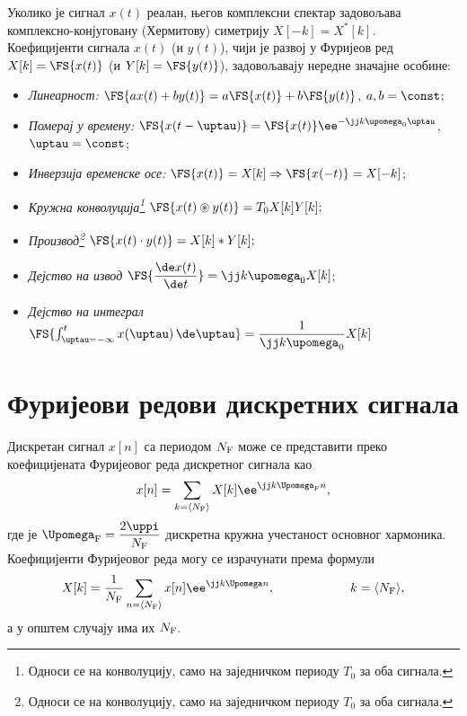 Уколико је сигнал $x(t)$ реалан, његов комплексни спектар задовољава комплексно-конјуговану (Хермитову) симетрију 
$X[-k] = X^{\ast}[k]$. \\[1mm]

Коефицијенти сигнала $x(t)$ (и $y(t)$), чији је развој у Фуријеов ред
$X[k] = \FS{x(t)}$ (и $Y[k] = \FS{y(t)}$),
задовољавају нередне значајне особине: 
\begin{itemize}\itemsep0pt
    \item \emph{Линеарност:}  $\FS{ax(t) + by(t)} = a \FS{x(t)} + b \FS{y(t)}$, $a,b = \const$;
    \item \emph{Померај у времену:} $ \FS{x(t-\uptau)} = \FS{x(t)} \ee^{-\jj k \upomega_{\rm 0} \uptau}$, $\uptau = \const$;
    \item \emph{Инверзија временске осе:} $\FS{x(t)} = X[k] \Rightarrow \FS{x(-t)} = X[-k] $;
    \item \emph{Кружна конволуција\footnote{Односи се на конволуцију, само на заједничком периоду $T_0$ за оба сигнала.}}
    $
    \FS{x(t) \circledast y(t)} = T_0 X[k] Y[k];
    $
    \item \emph{Производ\footnote{Односи се на конволуцију, само на заједничком периоду $T_0$ за оба сигнала.}}
    $
    \FS{x(t) \cdot y(t)} = X[k] \ast Y[k];
    $
    \item \emph{Дејство на извод} $\FS{ \dfrac{\de x(t)}{\de t} } = \jj k \upomega_0 X[k]$;
    \item \emph{Дејство на интеграл} $\FS{ \int_{\uptau = -\infty}^t x(\uptau) \, \de \uptau } = \dfrac{1}{\jj k \upomega_0} X[k]$ 
\end{itemize}


\section{Фуријеови редови дискретних сигнала}

Дискретан сигнал $x[n]$ са периодом $N_{\rm F}$ може се представити преко коефицијената Фуријеовог 
реда дискретног сигнала као
\begin{eqnarray}
    x[n] = \sum_{k = \langle N_{\rm F} \rangle } X[k] \ee^{ \jj k \Upomega_{\rm F} n }, 
\end{eqnarray}
где је $\Upomega_{\rm F} = \dfrac{2\uppi}{N_{\rm F}}$ дискретна кружна учестаност основног хармоника. Коефицијенти 
Фуријеовог реда могу се израчунати према формули 
\begin{equation}
    X[k] = \dfrac{1}{N_{\rm F}} \sum_{n = \langle N_{\rm F} \rangle} x[n] \ee^{\jj k \Upomega n}, 
    \qquad\qquad\qquad
    k = \langle N_{\rm F} \rangle,
\end{equation}
а у општем случају има их $N_{\rm F}$. 


